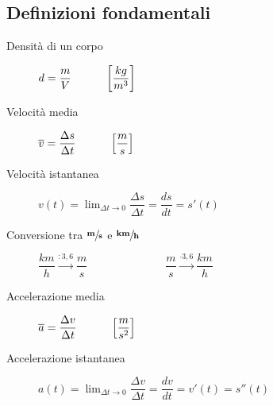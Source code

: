 \documentclass[a4paper,11pt,italian]{article}
\begin{document}
\subsection{Definizioni fondamentali}
\begin{description}
  \item[Densità di un corpo] 
  $ d = \dfrac{m}{V} \hspace*{3em} \left[ \dfrac{kg}{m^3} \right] $
  
  \item[Velocità media]
  $ \overline{v} = \dfrac{\Delta s}{\Delta t} \hspace*{3em} \left[ \dfrac{m}{s} \right] $

  \item[Velocità istantanea] 
  $ v(t) =  \displaystyle\lim_{\Delta t \rightarrow 0} \dfrac{\Delta s}{\Delta t} = \dfrac{ds}{dt} = s'(t) $
  
  \item[Conversione tra $ \sfrac{\mathbf{m}}{\mathbf{s}} $ e $ \sfrac{\mathbf{km}}{\mathbf{h}} $] $ \dfrac{km}{h} \xrightarrow{: 3,6} \dfrac{m}{s} $~~~~~~~~~~~~~~$ \dfrac{m}{s} \xrightarrow{\cdot 3,6} \dfrac{km}{h} $
  
  \item[Accelerazione media] 
  $ \overline{a} = \dfrac{\Delta v}{\Delta t} \hspace*{3em} \left[ \dfrac{m}{s^2} \right]  $

  \item[Accelerazione istantanea] 
  $ a(t) =  \displaystyle\lim_{\Delta t \rightarrow 0} \dfrac{\Delta v}{\Delta t} = \dfrac{dv}{dt} = v'(t) = s''(t) $  
\end{description}
\end{document}
